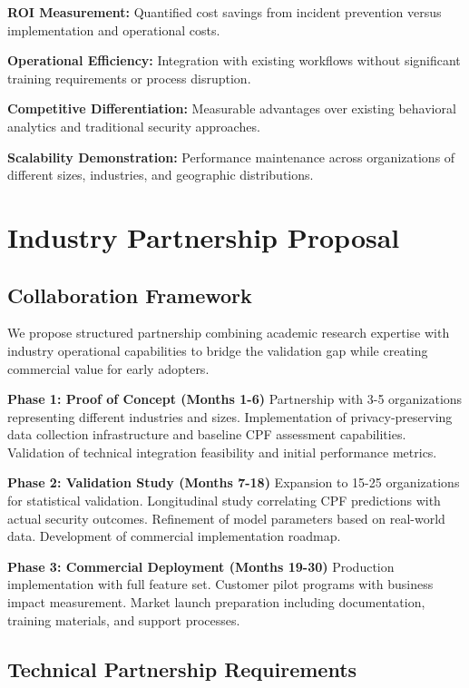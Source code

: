 \documentclass[10pt,twocolumn]{IEEEtran}
\begin{document}
\textbf{ROI Measurement:} Quantified cost savings from incident prevention versus implementation and operational costs.

\textbf{Operational Efficiency:} Integration with existing workflows without significant training requirements or process disruption.

\textbf{Competitive Differentiation:} Measurable advantages over existing behavioral analytics and traditional security approaches.

\textbf{Scalability Demonstration:} Performance maintenance across organizations of different sizes, industries, and geographic distributions.

\section{Industry Partnership Proposal}

\subsection{Collaboration Framework}

We propose structured partnership combining academic research expertise with industry operational capabilities to bridge the validation gap while creating commercial value for early adopters.

\textbf{Phase 1: Proof of Concept (Months 1-6)}
Partnership with 3-5 organizations representing different industries and sizes. Implementation of privacy-preserving data collection infrastructure and baseline CPF assessment capabilities. Validation of technical integration feasibility and initial performance metrics.

\textbf{Phase 2: Validation Study (Months 7-18)}
Expansion to 15-25 organizations for statistical validation. Longitudinal study correlating CPF predictions with actual security outcomes. Refinement of model parameters based on real-world data. Development of commercial implementation roadmap.

\textbf{Phase 3: Commercial Deployment (Months 19-30)}
Production implementation with full feature set. Customer pilot programs with business impact measurement. Market launch preparation including documentation, training materials, and support processes.

\subsection{Technical Partnership Requirements}
\end{document}
